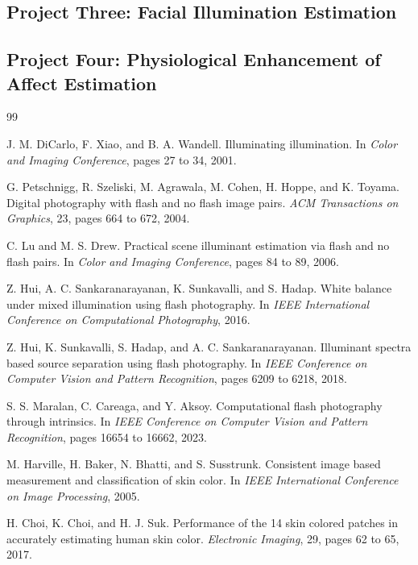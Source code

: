 \documentclass[12pt]{article}
\begin{document}
\subsection{Project Three: Facial Illumination Estimation}

\subsection{Project Four: Physiological Enhancement of Affect Estimation}

\begin{thebibliography}{99}

J. M. DiCarlo, F. Xiao, and B. A. Wandell.
Illuminating illumination.
In \textit{Color and Imaging Conference}, pages 27 to 34, 2001.

G. Petschnigg, R. Szeliski, M. Agrawala, M. Cohen, H. Hoppe, and K. Toyama.
Digital photography with flash and no flash image pairs.
\textit{ACM Transactions on Graphics}, 23, pages 664 to 672, 2004.

C. Lu and M. S. Drew.
Practical scene illuminant estimation via flash and no flash pairs.
In \textit{Color and Imaging Conference}, pages 84 to 89, 2006.

Z. Hui, A. C. Sankaranarayanan, K. Sunkavalli, and S. Hadap.
White balance under mixed illumination using flash photography.
In \textit{IEEE International Conference on Computational Photography}, 2016.

Z. Hui, K. Sunkavalli, S. Hadap, and A. C. Sankaranarayanan.
Illuminant spectra based source separation using flash photography.
In \textit{IEEE Conference on Computer Vision and Pattern Recognition}, pages 6209 to 6218, 2018.

S. S. Maralan, C. Careaga, and Y. Aksoy.
Computational flash photography through intrinsics.
In \textit{IEEE Conference on Computer Vision and Pattern Recognition}, pages 16654 to 16662, 2023.

M. Harville, H. Baker, N. Bhatti, and S. Susstrunk.
Consistent image based measurement and classification of skin color.
In \textit{IEEE International Conference on Image Processing}, 2005.

H. Choi, K. Choi, and H. J. Suk.
Performance of the 14 skin colored patches in accurately estimating human skin color.
\textit{Electronic Imaging}, 29, pages 62 to 65, 2017.


\end{thebibliography}
\end{document}

